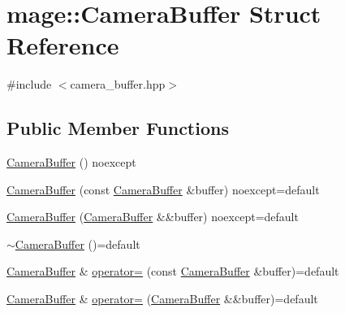 \hypertarget{structmage_1_1_camera_buffer}{}\section{mage\+:\+:Camera\+Buffer Struct Reference}
\label{structmage_1_1_camera_buffer}


{\ttfamily \#include $<$camera\+\_\+buffer.\+hpp$>$}

\subsection*{Public Member Functions}
\begin{DoxyCompactItemize}
\item 
\hyperlink{structmage_1_1_camera_buffer_a4f90a7a3c4064fe60f6af1142795afd2}{Camera\+Buffer} () noexcept
\item 
\hyperlink{structmage_1_1_camera_buffer_a83b3397d4a064cd6982da5caea2c05e5}{Camera\+Buffer} (const \hyperlink{structmage_1_1_camera_buffer}{Camera\+Buffer} \&buffer) noexcept=default
\item 
\hyperlink{structmage_1_1_camera_buffer_ade4f3fe1bd833a3f6ed43eadd0ffc241}{Camera\+Buffer} (\hyperlink{structmage_1_1_camera_buffer}{Camera\+Buffer} \&\&buffer) noexcept=default
\item 
\hyperlink{structmage_1_1_camera_buffer_a893ff21cfa017537ccd91dd816715701}{$\sim$\+Camera\+Buffer} ()=default
\item 
\hyperlink{structmage_1_1_camera_buffer}{Camera\+Buffer} \& \hyperlink{structmage_1_1_camera_buffer_a4c2f048e1c441ae147455722d9cd4af7}{operator=} (const \hyperlink{structmage_1_1_camera_buffer}{Camera\+Buffer} \&buffer)=default
\item 
\hyperlink{structmage_1_1_camera_buffer}{Camera\+Buffer} \& \hyperlink{structmage_1_1_camera_buffer_a901081932ab76c9bdfacb0814e821190}{operator=} (\hyperlink{structmage_1_1_camera_buffer}{Camera\+Buffer} \&\&buffer)=default
\end{DoxyCompactItemize}
